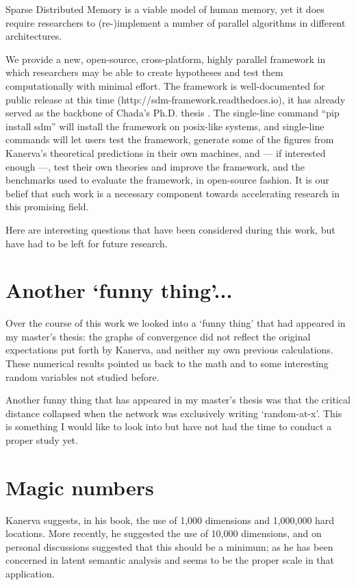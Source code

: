 Sparse Distributed Memory is a viable model of human memory, yet it does require researchers to (re-)implement a number of parallel algorithms in different architectures.

We provide a new, open-source, cross-platform, highly parallel framework in which researchers may be able to create hypotheses and test them computationally with minimal effort. The framework is well-documented for public release at this time (http://sdm-framework.readthedocs.io), it has already served as the backbone of Chada's Ph.D. thesis \citep{chada2016you}. The single-line command ``pip install sdm'' will install the framework on posix-like systems, and single-line commands will let users test the framework, generate some of the figures from Kanerva's theoretical predictions in their own machines, and --- if interested enough ---, test their own theories and improve the framework, and the benchmarks used to evaluate the framework, in open-source fashion. It is our belief that such work is a necessary component towards accelerating research in this promising field.

Here are interesting questions that have been considered during this work, but have had to be left for future research.


\section{Another `funny thing'...}

Over the course of this work we looked into a `funny thing' that had appeared in my master's thesis:  the graphs of convergence did not reflect the original expectations put forth by Kanerva, and neither my own previous calculations.  These numerical results pointed us back to the math and to some interesting random variables not studied before.

Another funny thing that has appeared in my master's thesis was that the critical distance collapsed when the network was exclusively writing `random-at-x'.  This is something I would like to look into but have not had the time to conduct a proper study yet.

\section{Magic numbers}

Kanerva suggests, in his book, the use of 1,000 dimensions and 1,000,000 hard locations.  More recently, he suggested the use of 10,000 dimensions, and on personal discussions suggested that this should be a minimum; as he has been concerned in latent semantic analysis and seems to be the proper scale in that application.

